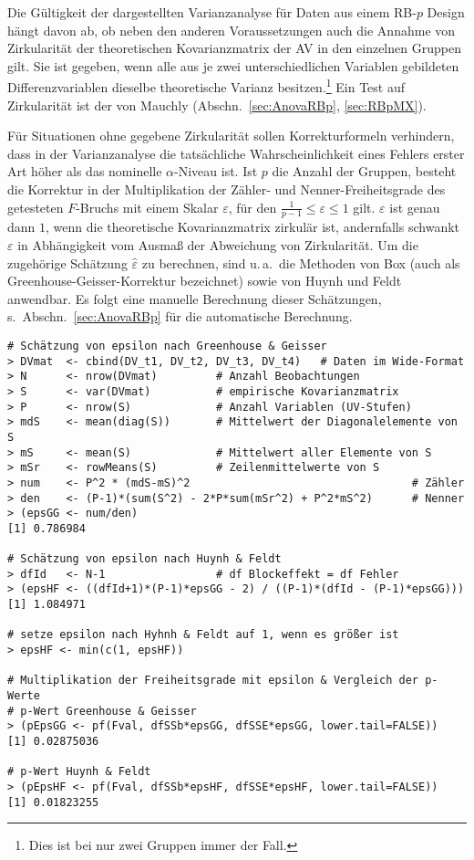 Die Gültigkeit der dargestellten Varianzanalyse für Daten aus einem RB-$p$ Design hängt davon ab, ob neben den anderen Voraussetzungen auch die Annahme von Zirkularität der theoretischen Kovarianzmatrix der AV in den einzelnen Gruppen gilt. Sie ist gegeben, wenn alle aus je zwei unterschiedlichen Variablen gebildeten Differenzvariablen dieselbe theoretische Varianz besitzen.\footnote{Dies ist bei nur zwei Gruppen immer der Fall.} Ein Test auf Zirkularität ist der von Mauchly (Abschn.\ \ref{sec:AnovaRBp}, \ref{sec:RBpMX}).

Für Situationen ohne gegebene Zirkularität sollen Korrekturformeln verhindern, dass in der Varianzanalyse die tatsächliche Wahrscheinlichkeit eines Fehlers erster Art höher als das nominelle $\alpha$-Niveau ist. Ist $p$ die Anzahl der Gruppen, besteht die Korrektur in der Multiplikation der Zähler- und Nenner-Freiheitsgrade des getesteten $F$-Bruchs mit einem Skalar $\varepsilon$, für den $\frac{1}{p-1} \leq \varepsilon \leq 1$ gilt. $\varepsilon$ ist genau dann $1$, wenn die theoretische Kovarianzmatrix zirkulär ist, andernfalls schwankt $\varepsilon$ in Abhängigkeit vom Ausmaß der Abweichung von Zirkularität. Um die zugehörige Schätzung $\hat{\varepsilon}$ zu berechnen, sind u.\,a.\ die Methoden von Box (auch als Greenhouse-Geisser-Korrektur bezeichnet) sowie von Huynh und Feldt anwendbar. Es folgt eine manuelle Berechnung dieser Schätzungen, s.\ Abschn.\ \ref{sec:AnovaRBp} für die automatische Berechnung.
\begin{lstlisting}
# Schätzung von epsilon nach Greenhouse & Geisser
> DVmat  <- cbind(DV_t1, DV_t2, DV_t3, DV_t4)   # Daten im Wide-Format
> N      <- nrow(DVmat)         # Anzahl Beobachtungen
> S      <- var(DVmat)          # empirische Kovarianzmatrix
> P      <- nrow(S)             # Anzahl Variablen (UV-Stufen)
> mdS    <- mean(diag(S))       # Mittelwert der Diagonalelemente von S
> mS     <- mean(S)             # Mittelwert aller Elemente von S
> mSr    <- rowMeans(S)         # Zeilenmittelwerte von S
> num    <- P^2 * (mdS-mS)^2                                  # Zähler
> den    <- (P-1)*(sum(S^2) - 2*P*sum(mSr^2) + P^2*mS^2)      # Nenner
> (epsGG <- num/den)
[1] 0.786984

# Schätzung von epsilon nach Huynh & Feldt
> dfId   <- N-1                 # df Blockeffekt = df Fehler
> (epsHF <- ((dfId+1)*(P-1)*epsGG - 2) / ((P-1)*(dfId - (P-1)*epsGG)))
[1] 1.084971

# setze epsilon nach Hyhnh & Feldt auf 1, wenn es größer ist
> epsHF <- min(c(1, epsHF))

# Multiplikation der Freiheitsgrade mit epsilon & Vergleich der p-Werte
# p-Wert Greenhouse & Geisser
> (pEpsGG <- pf(Fval, dfSSb*epsGG, dfSSE*epsGG, lower.tail=FALSE))
[1] 0.02875036

# p-Wert Huynh & Feldt
> (pEpsHF <- pf(Fval, dfSSb*epsHF, dfSSE*epsHF, lower.tail=FALSE))
[1] 0.01823255
\end{lstlisting}

